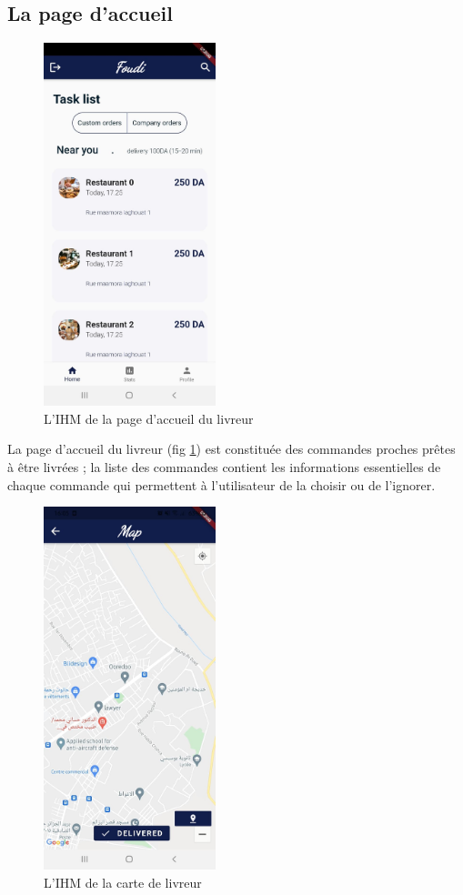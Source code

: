 \documentclass[french, a4paper, 12pt]{report}
\begin{document}
		\subsection{La page d'accueil} 
		\begin{figure}[h!]
			\center
			\includegraphics[width=5cm]{screenshots/DeliveryViews/Homepage(list of orders).jpg}
			\caption{L'IHM de la page d'accueil du livreur}
			\label{fig:delihp}
		\end{figure}
		La page d'accueil du livreur (fig \ref{fig:delihp}) est constituée des commandes proches prêtes à être livrées ; la liste des commandes contient les informations essentielles de chaque commande qui permettent à l'utilisateur de la choisir ou de l'ignorer.
		\newpage
		\begin{figure}[h!]
			\center
			\includegraphics[width=5cm]{screenshots/DeliveryViews/ClientPositionMap.jpg}
			\caption{L'IHM de la carte de livreur}
			\label{fig:delimp}
		\end{figure}
		
\end{document}
